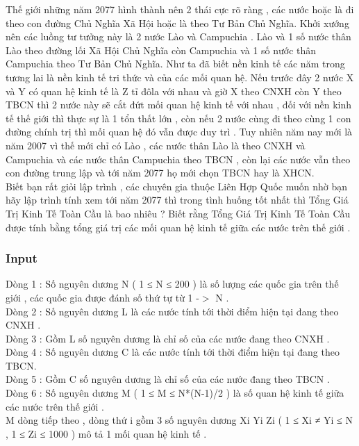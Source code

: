



   Thế giới những năm 2077 hình thành nên 2 thái cực rõ ràng , các nước hoặc là đi theo con đường Chủ Nghĩa Xã Hội hoặc là theo Tư Bản Chủ Nghĩa. Khởi xướng nên các luồng tư tưởng này là 2 nước Lào và Campuchia . Lào và 1 số nước thân Lào theo đường lối Xã Hội Chủ Nghĩa còn Campuchia và 1 số nước thân Campuchia theo Tư Bản Chủ Nghĩa. Như ta đã biết nền kinh tế các năm trong tương lai là nền kinh tế tri thức và của các mối quan hệ. Nếu trước đây 2 nước X và Y có quan hệ kinh tế là Z tỉ đôla với nhau và giờ X theo CNXH còn Y theo TBCN thì 2 nước này sẽ cắt đứt mối quan hệ kinh tế với nhau , đối với nền kinh tế thế giới thì thực sự là 1 tổn thất lớn , còn nếu 2 nước cùng đi theo cùng 1 con đường chính trị thì mối quan hệ đó vẫn được duy trì . Tuy nhiên năm nay mới là năm 2007 vì thế mới chỉ có Lào , các nước thân Lào là theo CNXH và Campuchia và các nước thân Campuchia theo TBCN , còn lại các nước vẫn theo con đường trung lập và tới năm 2077 họ mới chọn TBCN hay là XHCN.   
\\   Biết bạn rất giỏi lập trình , các chuyên gia thuộc Liên Hợp Quốc muốn nhờ bạn hãy lập trình tính xem tới năm 2077 thì trong tình huống tốt nhất thì Tổng Giá Trị Kinh Tế Toàn Cầu là bao nhiêu ? Biết rằng Tổng Giá Trị Kinh Tế Toàn Cầu được tính bằng tổng giá trị các mối quan hệ kinh tế giữa các nước trên thế giới .  

\subsubsection{   Input  }

   Dòng 1 : Số nguyên dương N ( 1 ≤ N ≤ 200 ) là số lượng các quốc gia trên thế giới , các quốc gia được đánh số thứ tự từ 1 -$>$ N .   
\\   Dòng 2 : Số nguyên dương L là các nước tính tới thời điểm hiện tại đang theo CNXH .   
\\   Dòng 3 : Gồm L số nguyên dương là chỉ số của các nước đang theo CNXH .   
\\   Dòng 4 : Số nguyên dương C là các nước tính tới thời điểm hiện tại đang theo TBCN.   
\\   Dòng 5 : Gồm C số nguyên dương là chỉ số của các nước đang theo TBCN .   
\\   Dòng 6 : Số nguyên dương M ( 1 ≤ M ≤ N*(N-1)/2 ) là số quan hệ kinh tế giữa các nước trên thế giới .   
\\   M dòng tiếp theo , dòng thứ i gồm 3 số nguyên dương Xi Yi Zi ( 1 ≤ Xi ≠ Yi ≤ N , 1 ≤ Zi ≤ 1000 ) mô tả 1 mối quan hệ kinh tế .  


